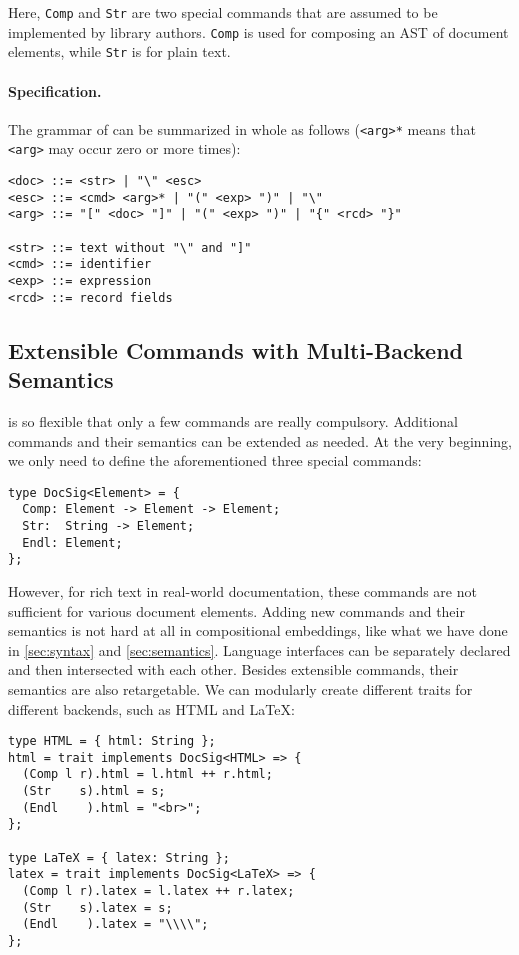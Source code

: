\noindent Here, \lstinline{Comp} and \lstinline{Str} are two special commands
that are assumed to be implemented by library authors. \lstinline{Comp} is used
for composing an AST of document elements, while \lstinline{Str} is for plain
text.

\paragraph{Specification.}
The grammar of \ExT can be summarized in whole as follows (\lstinline{<arg>*}
means that \lstinline{<arg>} may occur zero or more times):

\begin{Verbatim}[fontsize=\small]
<doc> ::= <str> | "\" <esc>
<esc> ::= <cmd> <arg>* | "(" <exp> ")" | "\"
<arg> ::= "[" <doc> "]" | "(" <exp> ")" | "{" <rcd> "}"

<str> ::= text without "\" and "]"
<cmd> ::= identifier
<exp> ::= expression
<rcd> ::= record fields
\end{Verbatim}

\subsection{Extensible Commands with Multi-Backend Semantics}

\ExT is so flexible that only a few commands are really compulsory. Additional
commands and their semantics can be extended as needed. At the very beginning,
we only need to define the aforementioned three special commands:

\begin{lstlisting}
type DocSig<Element> = {
  Comp: Element -> Element -> Element;
  Str:  String -> Element;
  Endl: Element;
};
\end{lstlisting}

\noindent
However, for rich text in real-world documentation, these commands are not
sufficient for various document elements. Adding new commands and their
semantics is not hard at all in compositional embeddings, like what we have done
in \autoref{sec:syntax} and \autoref{sec:semantics}. Language interfaces can be
separately declared and then intersected with each other. Besides extensible
commands, their semantics are also retargetable. We can modularly create
different traits for different backends, such as HTML and \LaTeX:

\begin{lstlisting}
type HTML = { html: String };
html = trait implements DocSig<HTML> => {
  (Comp l r).html = l.html ++ r.html;
  (Str    s).html = s;
  (Endl    ).html = "<br>";
};

type LaTeX = { latex: String };
latex = trait implements DocSig<LaTeX> => {
  (Comp l r).latex = l.latex ++ r.latex;
  (Str    s).latex = s;
  (Endl    ).latex = "\\\\";
};
\end{lstlisting}

